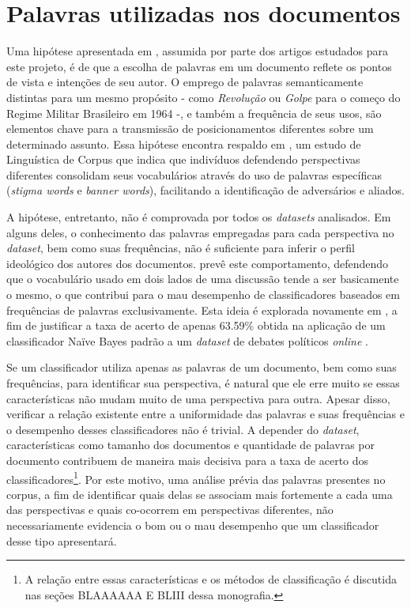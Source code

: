 \section{Palavras utilizadas nos documentos}

Uma hipótese apresentada em \cite{lin-et-al2006}, assumida por parte dos artigos estudados para este projeto, é de que a escolha de palavras em um documento reflete os pontos de vista e intenções de seu autor. O emprego de palavras semanticamente distintas para um mesmo propósito - como \emph{Revolução} ou \emph{Golpe} para o começo do Regime Militar Brasileiro em 1964 -, e também a frequência de seus usos, são elementos chave para a transmissão de posicionamentos diferentes sobre um determinado assunto. %
Essa hipótese encontra respaldo em \cite{teubert2001}, um estudo de Linguística de Corpus \cite{biber-d1998}\cite{halliday2004} que indica que indivíduos defendendo perspectivas diferentes consolidam seus vocabulários através do uso de palavras específicas (\emph{stigma words} e \emph{banner words}), facilitando a identificação de adversários e aliados. 

A hipótese, entretanto, não é comprovada por todos os \emph{datasets} analisados. Em alguns deles, o conhecimento das palavras empregadas para cada perspectiva no \emph{dataset}, bem como suas frequências, não é suficiente para inferir o perfil ideológico dos autores dos documentos. \cite{agrawal2003} prevê este comportamento, defendendo que o vocabulário usado em dois lados de uma discussão tende a ser basicamente o mesmo, o que contribui para o mau desempenho de classificadores baseados em frequências de palavras exclusivamente. Esta ideia é explorada novamente em \cite{malouf-taking_sides}, a fim de justificar a taxa de acerto de apenas 63.59\% obtida na aplicação de um classificador Naïve Bayes padrão a um \emph{dataset} de debates políticos \emph{online} \cite{www-politics-org}.

Se um classificador utiliza apenas as palavras de um documento, bem como suas frequências, para identificar sua perspectiva, é natural que ele erre muito se essas características não mudam muito de uma perspectiva para outra. Apesar disso, verificar a relação existente entre a uniformidade das palavras e suas frequências e o desempenho desses classificadores não é trivial. A depender do \emph{dataset}, características como tamanho dos documentos e quantidade de palavras por documento contribuem de maneira mais decisiva para a taxa de acerto dos classificadores\footnote{A relação entre essas características e os métodos de classificação é discutida nas seções BLAAAAAA E BLIII dessa monografia.}. Por este motivo, uma análise prévia das palavras presentes no corpus, a fim de identificar quais delas se associam mais fortemente a cada uma das perspectivas e quais co-ocorrem em perspectivas diferentes, não necessariamente evidencia o bom ou o mau desempenho que um classificador desse tipo apresentará. 

